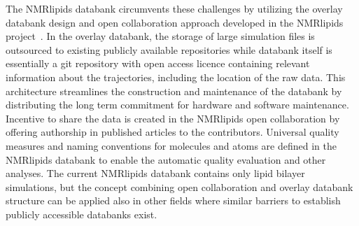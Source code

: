\documentclass[fleqn,10pt]{wlscirep}
\begin{document}
The NMRlipids databank circumvents these challenges by utilizing the overlay databank design and open collaboration approach developed in the NMRlipids project~\cite{botan15}. In the overlay databank, the storage of large simulation files is outsourced to existing publicly available repositories while databank itself is essentially a git repository with open access licence containing relevant information about the trajectories, including the location of the raw data. This architecture streamlines the construction and maintenance of the databank
%
by distributing the long term commitment for hardware and software maintenance. Incentive to share the data is created in the NMRlipids open collaboration by offering authorship in published articles to the contributors.
Universal quality measures and naming conventions for molecules and atoms are defined in the NMRlipids databank to enable the automatic quality evaluation and other analyses.
%
The current NMRlipids databank contains only lipid bilayer simulations, but the concept combining open collaboration and overlay databank structure can be applied also in other fields where similar barriers to establish publicly accessible databanks exist. 
%
\end{document}
